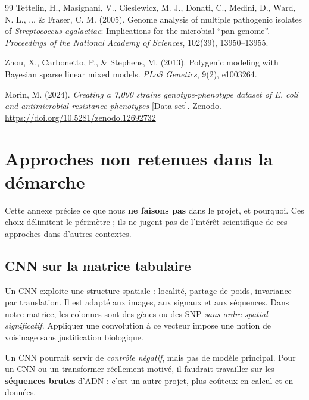 \documentclass[11pt,a4paper]{article}
\begin{document}
\begin{thebibliography}{99}
Tettelin, H., Masignani, V., Cieslewicz, M. J., Donati, C., Medini, D., Ward, N. L., ... \& Fraser, C. M. (2005).
Genome analysis of multiple pathogenic isolates of \textit{Streptococcus agalactiae}: Implications for the microbial ``pan-genome''.
\textit{Proceedings of the National Academy of Sciences}, 102(39), 13950--13955.

Zhou, X., Carbonetto, P., \& Stephens, M. (2013).
Polygenic modeling with Bayesian sparse linear mixed models.
\textit{PLoS Genetics}, 9(2), e1003264.

Morin, M. (2024).
\textit{Creating a 7,000 strains genotype-phenotype dataset of E. coli and antimicrobial resistance phenotypes} [Data set].
Zenodo.
\url{https://doi.org/10.5281/zenodo.12692732}

\end{thebibliography}

\newpage
\appendix

\section{Approches non retenues dans la démarche}
\label{annexe:hors-perimetre}

Cette annexe précise ce que nous \textbf{ne faisons pas} dans le projet, et pourquoi. Ces choix délimitent le périmètre ; ils ne jugent pas de l'intérêt scientifique de ces approches dans d'autres contextes.

\subsection{CNN sur la matrice tabulaire}

Un CNN exploite une structure spatiale : localité, partage de poids, invariance par translation. Il est adapté aux images, aux signaux et aux séquences. Dans notre matrice, les colonnes sont des gènes ou des SNP \emph{sans ordre spatial significatif}. Appliquer une convolution à ce vecteur impose une notion de voisinage sans justification biologique.

Un CNN pourrait servir de \emph{contrôle négatif}, mais pas de modèle principal. Pour un CNN ou un transformer réellement motivé, il faudrait travailler sur les \textbf{séquences brutes} d'ADN : c'est un autre projet, plus coûteux en calcul et en données.
\end{document}
